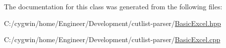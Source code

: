 The documentation for this class was generated from the following files\+:\begin{DoxyCompactItemize}
\item 
C\+:/cygwin/home/\+Engineer/\+Development/cutlist-\/parser/\hyperlink{_basic_excel_8hpp}{Basic\+Excel.\+hpp}\item 
C\+:/cygwin/home/\+Engineer/\+Development/cutlist-\/parser/\hyperlink{_basic_excel_8cpp}{Basic\+Excel.\+cpp}\end{DoxyCompactItemize}
